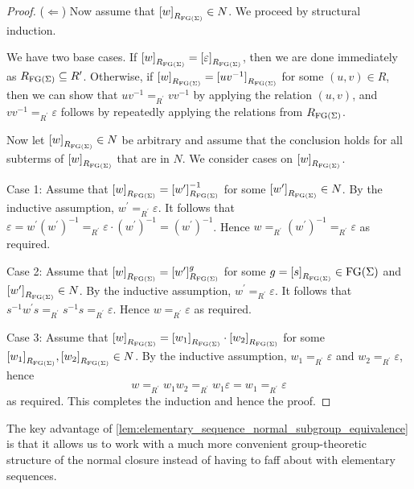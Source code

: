 \begin{proof}
  ($\Leftarrow$) Now assume that ${[w]}_{R_{\textrm{FG}(\Sigma)}} \in N$. We proceed by structural induction.

  We have two base cases. If ${[w]}_{R_{\textrm{FG}(\Sigma)}} = {[\varepsilon]}_{R_{\textrm{FG}(\Sigma)}}$, then we
  are done immediately as $R_{\textrm{FG}(\Sigma)}\subseteq R^\prime$. Otherwise, if
  ${[w]}_{R_{\textrm{FG}(\Sigma)}} = {[uv^{-1}]}_{R_{\textrm{FG}(\Sigma)}}$ for some $(u, v) \in R$, then we can show
  that $uv^{-1} =_{R^\prime} vv^{-1}$ by applying the relation $(u, v)$, and $vv^{-1}
  =_{R^\prime} \varepsilon$ follows by repeatedly applying the relations from $R_{\textrm{FG}(\Sigma)}$.

  Now let ${[w]}_{R_{\textrm{FG}(\Sigma)}}\in N$ be arbitrary and assume that the conclusion holds for all
  subterms of ${[w]}_{R_{\textrm{FG}(\Sigma)}}$ that are in $N$. We consider cases on ${[w]}_{R_{\textrm{FG}(\Sigma)}}$.

  Case 1: Assume that ${[w]}_{R_{\textrm{FG}(\Sigma)}} = {[w^\prime]}_{R_{\textrm{FG}(\Sigma)}}^{-1}$ for some
  ${[w^\prime]}_{R_{\textrm{FG}(\Sigma)}}\in N$. By the inductive assumption,
  $w^\prime =_{R^\prime} \varepsilon$. It follows that
  $\varepsilon = w^\prime {\left(w^\prime\right)}^{-1} =_{R^\prime} \varepsilon \cdot {\left(w^\prime\right)}^{-1} =
  {\left(w^\prime\right)}^{-1}$.
  Hence $w =_{R^\prime} {\left(w^\prime\right)}^{-1} =_{R^\prime} \varepsilon$ as required.

  Case 2: Assume that ${[w]}_{R_{\textrm{FG}(\Sigma)}} = {[w^\prime]}_{R_{\textrm{FG}(\Sigma)}}^{g}$ for some
  $g = {[s]}_{R_{\textrm{FG}(\Sigma)}} \in \textrm{FG}(\Sigma)$ and ${[w^\prime]}_{R_{\textrm{FG}(\Sigma)}}\in N$. By the inductive assumption,
  $w^\prime =_{R^\prime} \varepsilon$. It follows that $s^{-1}w^\prime s =_{R^\prime} s^{-1} s
  =_{R^\prime} \varepsilon$. Hence $w =_{R^\prime} \varepsilon$ as required.

  Case 3: Assume that ${[w]}_{R_{\textrm{FG}(\Sigma)}} = {[w_1]}_{R_{\textrm{FG}(\Sigma)}}\cdot {[w_2]}_{R_{\textrm{FG}(\Sigma)}}$ for some
  ${[w_1]}_{R_{\textrm{FG}(\Sigma)}}, {[w_2]}_{R_{\textrm{FG}(\Sigma)}} \in N$. By the inductive assumption,
  $w_1 =_{R^\prime} \varepsilon$ and $w_2 =_{R^\prime} \varepsilon$, hence
  \[
    w =_{R^\prime} w_1 w_2 =_{R^\prime} w_1\varepsilon  = w_1 =_{R^\prime} \varepsilon
  \]
  as required. This completes the induction and hence the proof.
\end{proof}

The key advantage of \cref{lem:elementary_sequence_normal_subgroup_equivalence} is that it allows
us to work with a much more convenient group-theoretic structure of the normal closure instead of
having to faff about with elementary sequences.


